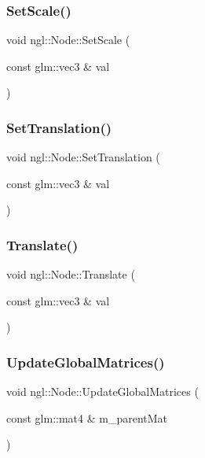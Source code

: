 \subsubsection{\texorpdfstring{Set\+Scale()}{SetScale()}}
{\footnotesize\ttfamily void ngl\+::\+Node\+::\+Set\+Scale (\begin{DoxyParamCaption}\item[{const glm\+::vec3 \&}]{val }\end{DoxyParamCaption})}

\mbox{\label{classngl_1_1_node_a773a04ee8b7e7a561ef4f3a00724722f}} 
\subsubsection{\texorpdfstring{Set\+Translation()}{SetTranslation()}}
{\footnotesize\ttfamily void ngl\+::\+Node\+::\+Set\+Translation (\begin{DoxyParamCaption}\item[{const glm\+::vec3 \&}]{val }\end{DoxyParamCaption})}

\mbox{\label{classngl_1_1_node_a91568b750a8b03b4bc395ae1b0eff15a}} 
\subsubsection{\texorpdfstring{Translate()}{Translate()}}
{\footnotesize\ttfamily void ngl\+::\+Node\+::\+Translate (\begin{DoxyParamCaption}\item[{const glm\+::vec3 \&}]{val }\end{DoxyParamCaption})}

\mbox{\label{classngl_1_1_node_a30a0980f14e5fc7c940002a8104fe813}} 
\subsubsection{\texorpdfstring{Update\+Global\+Matrices()}{UpdateGlobalMatrices()}}
{\footnotesize\ttfamily void ngl\+::\+Node\+::\+Update\+Global\+Matrices (\begin{DoxyParamCaption}\item[{const glm\+::mat4 \&}]{m\+\_\+parent\+Mat }\end{DoxyParamCaption})}



